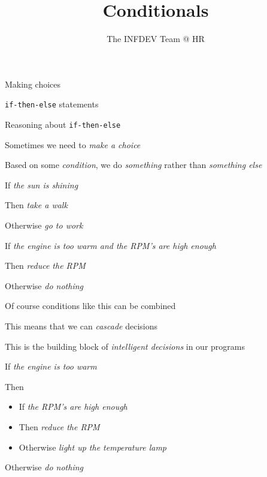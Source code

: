 \documentclass{beamer}
\title{Conditionals}
\author{The INFDEV Team @ HR}
\institute{Hogeschool Rotterdam \\ 
Rotterdam, Netherlands}
\date{}
\begin{document}
\maketitle

\begin{slide}{
\item Making choices
\item \texttt{if-then-else} statements
\item Reasoning about \texttt{if-then-else}
}\end{slide}

\begin{slide}{
\item Sometimes we need to \textit{make a choice}
\item Based on some \textit{condition}, we do \textit{something} rather than \textit{something else}
}\end{slide}

\begin{slide}{
\item If \textit{the sun is shining}
\item Then \textit{take a walk}
\item Otherwise \textit{go to work}
}\end{slide}

\begin{slide}{
\item If \textit{the engine is too warm and the RPM's are high enough}
\item Then \textit{reduce the RPM}
\item Otherwise \textit{do nothing}
}\end{slide}

\begin{slide}{
\item Of course conditions like this can be combined
\item This means that we can \textit{cascade} decisions
\item This is the building block of \textit{intelligent decisions} in our programs
}\end{slide}

\begin{slide}{
\item If \textit{the engine is too warm}
\item Then
\begin{itemize}
\item If \textit{the RPM's are high enough}
\item Then \textit{reduce the RPM}
\item Otherwise \textit{light up the temperature lamp}
\end{itemize}
\item Otherwise \textit{do nothing}
}\end{slide}
\end{document}
